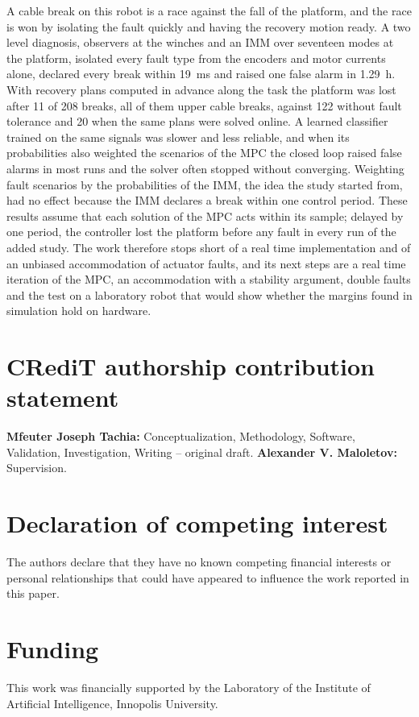 \documentclass[a4paper,fleqn]{cas-dc}
\begin{document}
A cable break on this robot is a race against the fall of the platform, and the race is won by isolating the fault quickly and having the recovery motion ready. A two level diagnosis, observers at the winches and an IMM over seventeen modes at the platform, isolated every fault type from the encoders and motor currents alone, declared every break within 19~ms and raised one false alarm in 1.29~h. With recovery plans computed in advance along the task the platform was lost after 11 of 208 breaks, all of them upper cable breaks, against 122 without fault tolerance and 20 when the same plans were solved online. A learned classifier trained on the same signals was slower and less reliable, and when its probabilities also weighted the scenarios of the MPC the closed loop raised false alarms in most runs and the solver often stopped without converging. Weighting fault scenarios by the probabilities of the IMM, the idea the study started from, had no effect because the IMM declares a break within one control period. These results assume that each solution of the MPC acts within its sample; delayed by one period, the controller lost the platform before any fault in every run of the added study. The work therefore stops short of a real time implementation and of an unbiased accommodation of actuator faults, and its next steps are a real time iteration of the MPC, an accommodation with a stability argument, double faults and the test on a laboratory robot that would show whether the margins found in simulation hold on hardware.

\section*{CRediT authorship contribution statement}
\textbf{Mfeuter Joseph Tachia:} Conceptualization, Methodology, Software, Validation, Investigation, Writing -- original draft. \textbf{Alexander V. Maloletov:} Supervision.

\section*{Declaration of competing interest}
The authors declare that they have no known competing financial interests or personal relationships that could have appeared to influence the work reported in this paper.

\section*{Funding}
This work was financially supported by the Laboratory of the Institute of Artificial Intelligence, Innopolis University.
\end{document}
